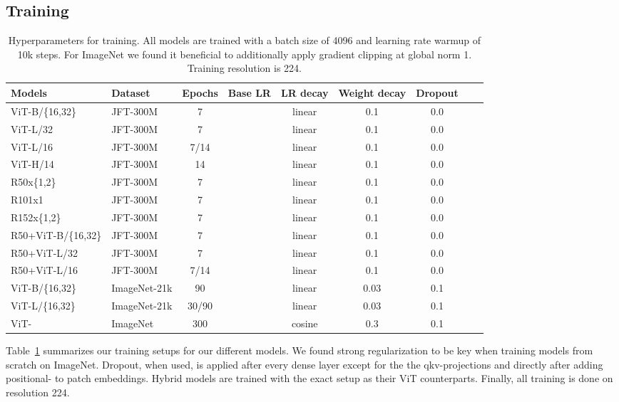 \documentclass{article} \usepackage{iclr2021_conference,times}
\newcommand{\oursabbrv}{ViT\xspace}
\newcommand{\imagenet}{ImageNet\xspace}
\begin{document}
\subsection{Training}\label{sec:training}
\begin{table}[t]
\centering
\small
\begin{tabular}{l l c c c c c c c}
\toprule
Models & Dataset & Epochs & Base LR & LR decay & Weight decay  & Dropout\\
\midrule
\oursabbrv-B/\{16,32\}     & JFT-300M     & 7     &  & linear & 0.1  & 0.0 \\
\oursabbrv-L/32            & JFT-300M     & 7     &  & linear & 0.1  & 0.0 \\
\oursabbrv-L/16            & JFT-300M     & 7/14  &  & linear & 0.1  & 0.0 \\
\oursabbrv-H/14            & JFT-300M     & 14    &  & linear & 0.1  & 0.0 \\
R50x\{1,2\}                & JFT-300M     & 7     &          & linear & 0.1  & 0.0 \\
R101x1                     & JFT-300M     & 7     &  & linear & 0.1  & 0.0 \\
R152x\{1,2\}               & JFT-300M     & 7     &  & linear & 0.1  & 0.0 \\
R50+\oursabbrv-B/\{16,32\} & JFT-300M     & 7     &  & linear & 0.1  & 0.0 \\
R50+\oursabbrv-L/32        & JFT-300M     & 7     &  & linear & 0.1  & 0.0 \\
R50+\oursabbrv-L/16        & JFT-300M     & 7/14  &  & linear & 0.1  & 0.0 \\
\oursabbrv-B/\{16,32\}     & ImageNet-21k & 90    &          & linear & 0.03 & 0.1 \\
\oursabbrv-L/\{16,32\}     & ImageNet-21k & 30/90 &          & linear & 0.03 & 0.1 \\
\oursabbrv-          & \imagenet    & 300   &  & cosine & 0.3  & 0.1 \\
\bottomrule
\end{tabular}
\caption{Hyperparameters for training. All models are trained with a batch size of 4096 and learning rate warmup of 10k steps. For \imagenet we found it beneficial to additionally apply gradient clipping at global norm 1. Training resolution is 224.}
\label{tbl:hparams-training}
\end{table}

Table~\ref{tbl:hparams-training} summarizes our training setups for our different models. We found strong regularization to be key when training models from scratch on \imagenet. Dropout, when used, is applied after every dense layer except for the the qkv-projections and directly after adding positional- to patch embeddings. Hybrid models are trained with the exact setup as their \oursabbrv counterparts. Finally, all training is done on resolution 224.
\end{document}
